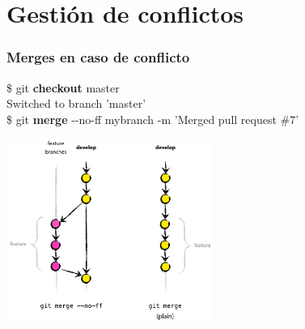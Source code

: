 \section{Gestión de conflictos}
\frame
{
\frametitle{Merges en caso de conflicto}
\$ git \textbf{checkout} master\\
Switched to branch 'master'\\
\$ git \textbf{merge} -{}-no-ff mybranch -m 'Merged pull request \#7' \\

\begin{center}
 \includegraphics[height=6cm]{imgs/gitmerge.png}
\end{center}
}
